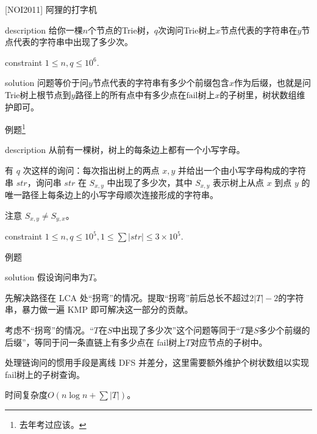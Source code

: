 \documentclass{beamer}
\theoremstyle{compact}
\def\le{\leqslant}
\def\fail{\textrm{fail}}
\begin{document}
\begin{frame}{[NOI2011] 阿狸的打字机}
	\begin{block}{description}
		给你一棵$n$个节点的Trie树，$q$次询问Trie树上$x$节点代表的字符串在$y$节点代表的字符串中出现了多少次。
	\end{block}
	\begin{block}{constraint}
		$1 \le n, q \le 10^6.$
	\end{block}
	\pause
	\begin{block}{solution}
		问题等价于问$y$节点代表的字符串有多少个前缀包含$x$作为后缀，也就是问Trie树上根节点到$y$路径上的所有点中有多少点在$\fail$树上$x$的子树里，树状数组维护即可。
	\end{block}
\end{frame}
\begin{frame}{例题\footnote{\tiny 去年考过应该。}}
	\begin{block}{description}
		从前有一棵树，树上的每条边上都有一个小写字母。

		有 $q$ 次这样的询问：每次指出树上的两点 $x,y$ 并给出一个由小写字母构成的字符串 $str$，询问串 $str$ 在 $S_{x,y}$ 中出现了多少次，其中 $S_{x,y}$ 表示树上从点 $x$ 到点 $y$ 的唯一路径上每条边上的小写字母顺次连接形成的字符串。

		注意 $S_{x,y} \neq S_{y,x}$。
	\end{block}
	\begin{block}{constraint}
		$1 \le n, q \le 10^5, 1 \le \sum |str| \le 3 \times 10^5.$
	\end{block}
\end{frame}
\begin{frame}{例题}
	\begin{block}{solution}
		假设询问串为$T$。

		先解决路径在 LCA 处“拐弯”的情况。提取“拐弯”前后总长不超过$2|T|-2$的字符串，暴力做一遍 KMP 即可解决这一部分的贡献。

		考虑不“拐弯”的情况。“$T$在$S$中出现了多少次”这个问题等同于“$T$是$S$多少个前缀的后缀”，等同于问一条直链上有多少点在 \fail 树上$T$对应节点的子树中。

		处理链询问的惯用手段是离线 DFS 并差分，这里需要额外维护个树状数组以实现 \fail 树上的子树查询。

		时间复杂度$O(n\log n+\sum|T|)$。
	\end{block}
\end{frame}
\end{document}
